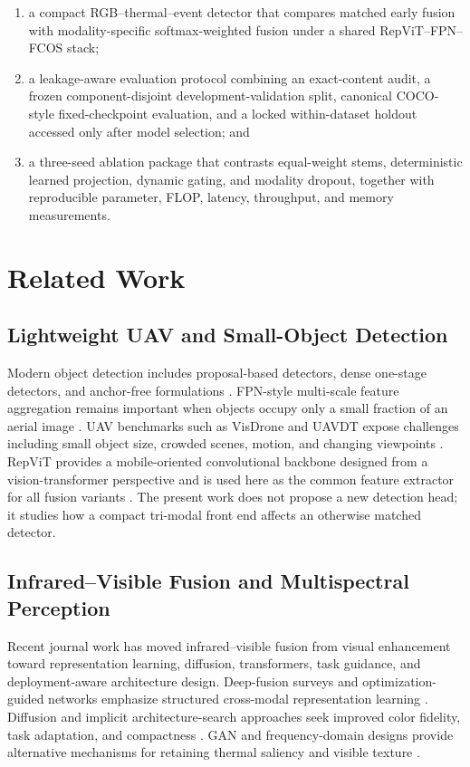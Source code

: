 \begin{enumerate}
    \item a compact RGB--thermal--event detector that compares matched early fusion with modality-specific softmax-weighted fusion under a shared RepViT--FPN--FCOS stack;
    \item a leakage-aware evaluation protocol combining an exact-content audit, a frozen component-disjoint development-validation split, canonical COCO-style fixed-checkpoint evaluation, and a locked within-dataset holdout accessed only after model selection; and
    \item a three-seed ablation package that contrasts equal-weight stems, deterministic learned projection, dynamic gating, and modality dropout, together with reproducible parameter, FLOP, latency, throughput, and memory measurements.
\end{enumerate}

\section{Related Work}

\subsection{Lightweight UAV and Small-Object Detection}

Modern object detection includes proposal-based detectors, dense one-stage detectors, and anchor-free formulations \cite{FasterRCNN2015,RetinaNet2017,FCOS2019}. FPN-style multi-scale feature aggregation remains important when objects occupy only a small fraction of an aerial image \cite{FPN2017}. UAV benchmarks such as VisDrone and UAVDT expose challenges including small object size, crowded scenes, motion, and changing viewpoints \cite{VisDrone2018,UAVDT2018}. RepViT provides a mobile-oriented convolutional backbone designed from a vision-transformer perspective and is used here as the common feature extractor for all fusion variants \cite{RepViT2024}. The present work does not propose a new detection head; it studies how a compact tri-modal front end affects an otherwise matched detector.

\subsection{Infrared--Visible Fusion and Multispectral Perception}

Recent journal work has moved infrared--visible fusion from visual enhancement toward representation learning, diffusion, transformers, task guidance, and deployment-aware architecture design. Deep-fusion surveys and optimization-guided networks emphasize structured cross-modal representation learning \cite{ZhangDemiris2023DeepFusion,Li2023LRRNet}. Diffusion and implicit architecture-search approaches seek improved color fidelity, task adaptation, and compactness \cite{Yue2023DifFusion,Liu2024TIMFusion}. GAN and frequency-domain designs provide alternative mechanisms for retaining thermal saliency and visible texture \cite{Rao2023ATGAN,Wang2024FreqGAN}.

